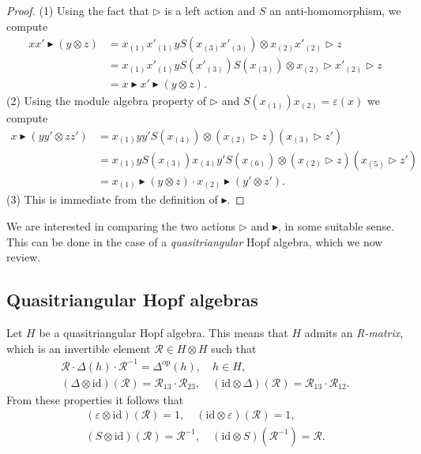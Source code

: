 \documentclass[a4paper, 12pt, reqno, english]{amsart}
\numberwithin{equation}{section}
\numberwithin{figure}{section}
\theoremstyle{plain}
\theoremstyle{plain}
\theoremstyle{plain}
\theoremstyle{plain}
\theoremstyle{plain}
\theoremstyle{definition}
\theoremstyle{definition}
\theoremstyle{definition}
\theoremstyle{remark}
\theoremstyle{definition}
\theoremstyle{definition}
\newcommand{\id}{\mathrm{id}}
\newcommand{\op}{\mathrm{op}}
\newcommand{\calR}{\mathcal{R}}
\begin{document}
\begin{proof}
(1) Using the fact that $\triangleright$ is a left action and $S$ an anti-homomorphism, we compute
\[
\begin{split}
x x' \blacktriangleright (y \otimes z)
& = x_{(1)} x'_{(1)} y S(x_{(3)} x'_{(3)}) \otimes x_{(2)} x'_{(2)} \triangleright z \\
& = x_{(1)} x'_{(1)} y S(x'_{(3)}) S(x_{(3)}) \otimes x_{(2)} \triangleright x'_{(2)} \triangleright z \\
& = x \blacktriangleright x' \blacktriangleright (y \otimes z).
\end{split}
\]
(2) Using the module algebra property of $\triangleright$ and $S(x_{(1)}) x_{(2)} = \varepsilon(x)$ we compute
\[
\begin{split}
x \blacktriangleright (y y' \otimes z z')
& = x_{(1)} y y' S(x_{(4)}) \otimes (x_{(2)} \triangleright z) (x_{(3)} \triangleright z') \\
& = x_{(1)} y S(x_{(3)}) x_{(4)} y' S(x_{(6)}) \otimes (x_{(2)} \triangleright z) (x_{(5)} \triangleright z') \\
& = x_{(1)} \blacktriangleright (y \otimes z) \cdot x_{(2)} \blacktriangleright (y' \otimes z').
\end{split}
\]
(3) This is immediate from the definition of $\blacktriangleright$.
\end{proof}

We are interested in comparing the two actions $\triangleright$ and $\blacktriangleright$, in some suitable sense.
This can be done in the case of a \emph{quasitriangular} Hopf algebra, which we now review.

\subsection{Quasitriangular Hopf algebras}

Let $H$ be a quasitriangular Hopf algebra.
This means that $H$ admits an \emph{R-matrix}, which is an invertible element $\calR \in H \otimes H$ such that
\[
\begin{gathered}
\calR \cdot \Delta(h) \cdot \calR^{-1} = \Delta^\op(h), \quad h \in H, \\
(\Delta \otimes \id) (\calR) = \calR_{1 3} \cdot \calR_{2 3}, \quad
(\id \otimes \Delta) (\calR) = \calR_{1 3} \cdot \calR_{1 2}.
\end{gathered}
\]
From these properties it follows that
\[
\begin{gathered}
(\varepsilon \otimes \id) (\calR) = 1, \quad
(\id \otimes \varepsilon) (\calR) = 1, \\
(S \otimes \id) (\calR) = \calR^{-1}, \quad
(\id \otimes S) (\calR^{-1}) = \calR.
\end{gathered}
\]
\end{document}

